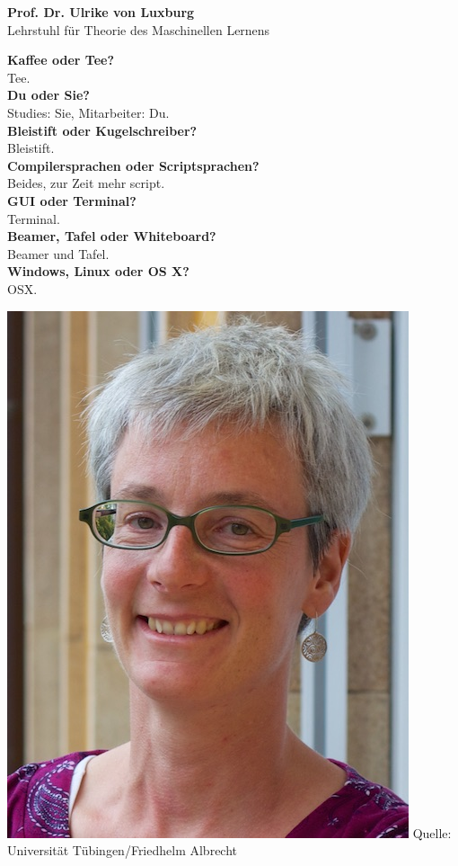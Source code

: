 \large \textbf{Prof. Dr. Ulrike von Luxburg}\\
\normalsize Lehrstuhl für Theorie des Maschinellen Lernens\\
\normalsize

\begin{minipage}[h]{0.65\textwidth}
	\textbf{Kaffee oder Tee?}\\
	Tee.\\
	\textbf{Du oder Sie?}\\
	Studies: Sie, Mitarbeiter: Du.
	\\
	\textbf{Bleistift oder Kugelschreiber?}\\
	Bleistift.
	\\
	\textbf{Compilersprachen oder Scriptsprachen?}\\
	Beides, zur Zeit mehr script.
	\\
	\textbf{GUI oder Terminal?}\\
	Terminal.
	\\
	\textbf{Beamer, Tafel oder Whiteboard?}\\
	Beamer und Tafel.
	\\
	\textbf{Windows, Linux oder OS X?}\\
	OSX.
	\\
\end{minipage}
\begin{minipage}[h]{0.35\textwidth}
	\vspace{0.5cm}
	\includegraphics[width=\textwidth]{content/pictures/luxburg.jpg}
	Quelle: Universität Tübingen/Friedhelm Albrecht
\end{minipage}

